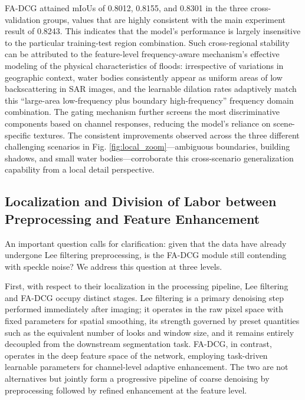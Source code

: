 \documentclass[lettersize,journal]{IEEEtran}
\begin{document}
FA-DCG attained mIoUs of 0.8012, 0.8155, and 0.8301 in the three cross-validation groups, values that are highly consistent with the main experiment result of 0.8243. This indicates that the model's performance is largely insensitive to the particular training-test region combination. Such cross-regional stability can be attributed to the feature-level frequency-aware mechanism's effective modeling of the physical characteristics of floods: irrespective of variations in geographic context, water bodies consistently appear as uniform areas of low backscattering in SAR images, and the learnable dilation rates adaptively match this ``large-area low-frequency plus boundary high-frequency'' frequency domain combination. The gating mechanism further screens the most discriminative components based on channel responses, reducing the model's reliance on scene-specific textures. The consistent improvements observed across the three different challenging scenarios in Fig. \ref{fig:local_zoom}---ambiguous boundaries, building shadows, and small water bodies---corroborate this cross-scenario generalization capability from a local detail perspective.

\subsection{Localization and Division of Labor between Preprocessing and Feature Enhancement}

An important question calls for clarification: given that the data have already undergone Lee filtering preprocessing, is the FA-DCG module still contending with speckle noise? We address this question at three levels.

First, with respect to their localization in the processing pipeline, Lee filtering and FA-DCG occupy distinct stages. Lee filtering is a primary denoising step performed immediately after imaging; it operates in the raw pixel space with fixed parameters for spatial smoothing, its strength governed by preset quantities such as the equivalent number of looks and window size, and it remains entirely decoupled from the downstream segmentation task. FA-DCG, in contrast, operates in the deep feature space of the network, employing task-driven learnable parameters for channel-level adaptive enhancement. The two are not alternatives but jointly form a progressive pipeline of coarse denoising by preprocessing followed by refined enhancement at the feature level.
\end{document}
